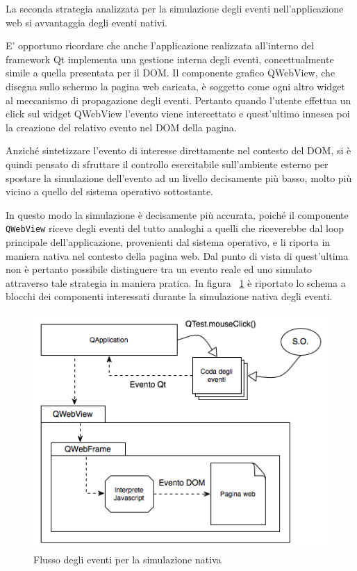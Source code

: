 La seconda strategia analizzata per la simulazione degli eventi nell'applicazione web si avvantaggia degli eventi nativi. 

E' opportuno ricordare che anche l'applicazione realizzata all'interno del framework Qt implementa una gestione interna degli eventi, concettualmente simile a quella presentata per il DOM. Il componente grafico QWebView, che disegna sullo schermo la pagina web caricata, è soggetto come ogni altro widget al meccanismo di propagazione degli eventi. Pertanto quando l'utente effettua un click sul widget QWebView l'evento viene intercettato e quest'ultimo innesca poi la creazione del relativo evento nel DOM della pagina. 

Anziché sintetizzare l'evento di interesse direttamente nel contesto del DOM, si è quindi pensato di sfruttare il controllo esercitabile sull'ambiente esterno per spostare la simulazione dell'evento ad un livello decisamente più basso, molto più vicino a quello del sistema operativo sottostante. 

In questo modo la simulazione è decisamente più accurata, poiché il componente \verb|QWebView| riceve degli eventi del tutto analoghi a quelli che riceverebbe dal loop principale dell'applicazione, provenienti dal sistema operativo, e li riporta in maniera nativa nel contesto della pagina web. Dal punto di vista di quest'ultima non è pertanto possibile distinguere tra un evento reale ed uno simulato attraverso tale strategia in maniera pratica. In figura ~\ref{fig:nativeEvents} è riportato lo schema a blocchi dei componenti interessati durante la simulazione nativa degli eventi.

\begin{figure}[htbp]
\begin{center}
\includegraphics[width=\textwidth]{images/native_events.png}
\caption{Flusso degli eventi per la simulazione nativa}
\label{fig:nativeEvents}
\end{center}
\end{figure}

